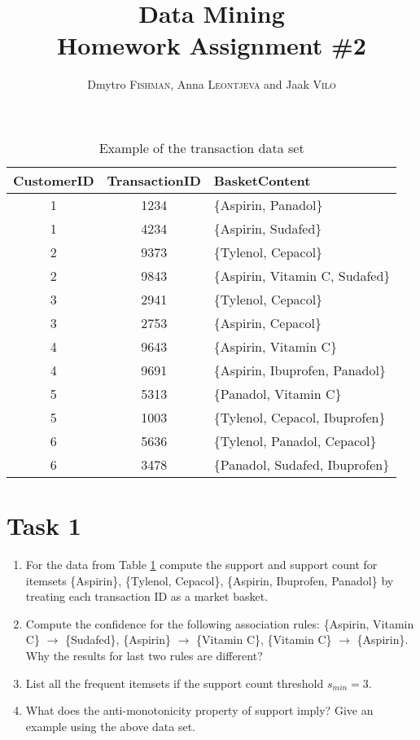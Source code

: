 \documentclass{article}
\title{Data Mining\\Homework Assignment \#2} %
\author{Dmytro \textsc{Fishman}, Anna \textsc{Leontjeva} and Jaak \textsc{Vilo}} %
\begin{document}
\maketitle %
\begin{table}[h]
\caption{Example of the transaction data set}
\label{tab:toyexample}
\begin{center}
    \begin{tabular}{| c | c | l|}
    \hline
    CustomerID & TransactionID& BasketContent \\ \hline
    	1 & 1234 & \{Aspirin, Panadol\}\\ \hline
    	1 & 4234 & \{Aspirin, Sudafed\}\\ \hline
    	2 & 9373& \{Tylenol, Cepacol\}\\ \hline
	2 & 9843& \{Aspirin, Vitamin C, Sudafed\}\\ \hline 
	3 & 2941& \{Tylenol, Cepacol\}\\ \hline  
	3 & 2753& \{Aspirin, Cepacol\}\\ \hline
	4 & 9643& \{Aspirin, Vitamin C\}\\ \hline
	4 & 9691& \{Aspirin, Ibuprofen, Panadol\}\\ \hline
	5 & 5313& \{Panadol, Vitamin C\}\\ \hline
	5 & 1003& \{Tylenol, Cepacol, Ibuprofen\}\\ \hline
	6 & 5636& \{Tylenol, Panadol, Cepacol\}\\ \hline
	6 & 3478& \{Panadol, Sudafed, Ibuprofen\}\\ \hline
 \end{tabular}
\end{center}
\end{table}
\section*{Task 1}
\begin{enumerate}
\item For the data from Table \ref{tab:toyexample} compute the support and support count for itemsets \{Aspirin\}, \{Tylenol, Cepacol\}, \{Aspirin, Ibuprofen, Panadol\} by treating each transaction ID as a market basket.
\item Compute the confidence for the following association rules: \{Aspirin, Vitamin C\} $\rightarrow$ \{Sudafed\}, \{Aspirin\} $\rightarrow$ \{Vitamin C\}, \{Vitamin C\} $\rightarrow$ \{Aspirin\}. Why the results for last two rules are different?
\item List all the frequent itemsets if the support count threshold $s_{min} = 3$.
\item What does the anti-monotonicity property of support imply? Give an example using the above data set. 
\end{enumerate}
\end{document}
